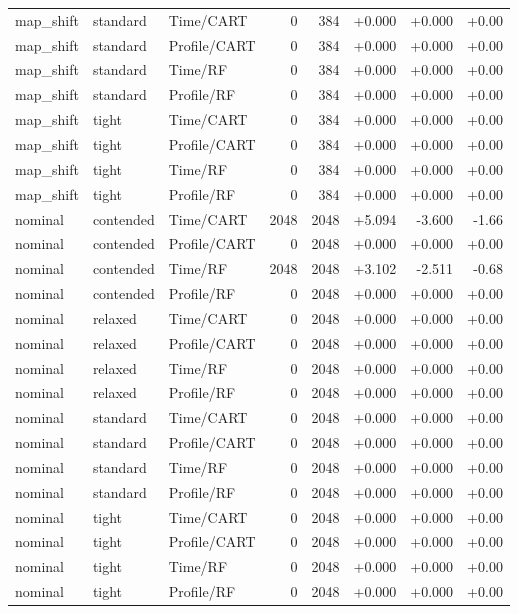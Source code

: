 \begin{longtable}{@{}lllrrrrr@{}}
map\_shift & standard & Time/CART & 0 & 384 & +0.000 & +0.000 & +0.00\\
map\_shift & standard & Profile/CART & 0 & 384 & +0.000 & +0.000 & +0.00\\
map\_shift & standard & Time/RF & 0 & 384 & +0.000 & +0.000 & +0.00\\
map\_shift & standard & Profile/RF & 0 & 384 & +0.000 & +0.000 & +0.00\\
map\_shift & tight & Time/CART & 0 & 384 & +0.000 & +0.000 & +0.00\\
map\_shift & tight & Profile/CART & 0 & 384 & +0.000 & +0.000 & +0.00\\
map\_shift & tight & Time/RF & 0 & 384 & +0.000 & +0.000 & +0.00\\
map\_shift & tight & Profile/RF & 0 & 384 & +0.000 & +0.000 & +0.00\\
nominal & contended & Time/CART & 2048 & 2048 & +5.094 & -3.600 & -1.66\\
nominal & contended & Profile/CART & 0 & 2048 & +0.000 & +0.000 & +0.00\\
nominal & contended & Time/RF & 2048 & 2048 & +3.102 & -2.511 & -0.68\\
nominal & contended & Profile/RF & 0 & 2048 & +0.000 & +0.000 & +0.00\\
nominal & relaxed & Time/CART & 0 & 2048 & +0.000 & +0.000 & +0.00\\
nominal & relaxed & Profile/CART & 0 & 2048 & +0.000 & +0.000 & +0.00\\
nominal & relaxed & Time/RF & 0 & 2048 & +0.000 & +0.000 & +0.00\\
nominal & relaxed & Profile/RF & 0 & 2048 & +0.000 & +0.000 & +0.00\\
nominal & standard & Time/CART & 0 & 2048 & +0.000 & +0.000 & +0.00\\
nominal & standard & Profile/CART & 0 & 2048 & +0.000 & +0.000 & +0.00\\
nominal & standard & Time/RF & 0 & 2048 & +0.000 & +0.000 & +0.00\\
nominal & standard & Profile/RF & 0 & 2048 & +0.000 & +0.000 & +0.00\\
nominal & tight & Time/CART & 0 & 2048 & +0.000 & +0.000 & +0.00\\
nominal & tight & Profile/CART & 0 & 2048 & +0.000 & +0.000 & +0.00\\
nominal & tight & Time/RF & 0 & 2048 & +0.000 & +0.000 & +0.00\\
nominal & tight & Profile/RF & 0 & 2048 & +0.000 & +0.000 & +0.00\\

\end{longtable}
